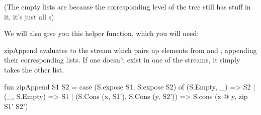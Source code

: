 (The empty lists are because the corresponding level of the tree still has stuff
in it, it's just all s)

\newpage

We will also give you this helper function, which you will need:

\spec
  {zipAppend}
  {{\small{}}}
  {}
  { evaluates to the stream which pairs up elements from
   and , appending their corresponding lists. If one doesn't
  exist in one of the streams, it simply takes the other list.}

\begin{codeblock}
  fun zipAppend S1 S2 =
    case (S.expose S1, S.expose S2) of
      (S.Empty, _) => S2
    | (_, S.Empty) => S1
    | (S.Cons (x, S1'), S.Cons (y, S2')) =>
        S.cons (x @ y, zip S1' S2')
\end{codeblock}


